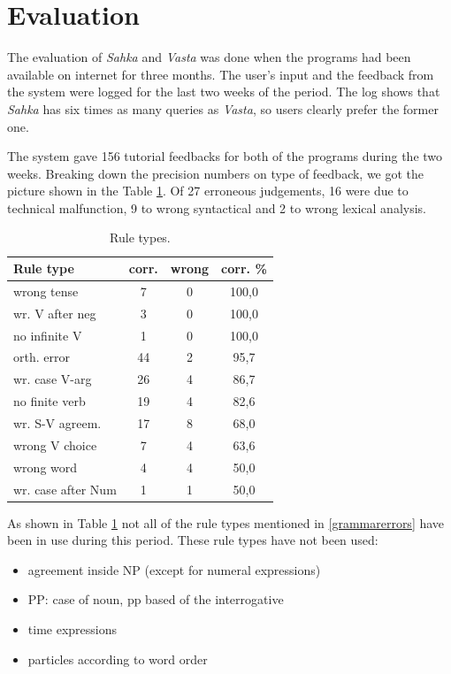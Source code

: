 \documentclass[11pt]{article}
\begin{document}
\section{Evaluation}
The evaluation of \textit{Sahka} and \textit{Vasta} was done when the programs had been available on internet for three months. The user's input and the feedback from the system were logged for the last two weeks of the period. The log shows that \textit{Sahka} has six times as many queries as \textit{Vasta}, so users clearly prefer the former one.


The system gave 156 tutorial feedbacks for both of the programs during the two weeks. Breaking down the precision numbers on type of feedback, we got the picture shown in the Table \ref{ruletypes}. Of 27 erroneous judgements, 16 were due to technical malfunction, 9 to wrong syntactical and 2 to wrong lexical analysis. \\

\begin{table}[htbp]
\begin{tabular}{|l|c|c|c|}
\hline 
\textbf{Rule type}  & \textbf{corr.} & \textbf{wrong}   & \textbf{corr. \% }  \\
\hline 
wrong tense         & 7     & 0     & 100,0     \\ 
wr. V after neg   & 3     & 0     & 100,0     \\ 
no infinite V       & 1     & 0     & 100,0     \\ 
\hline 
orth. error         & 44    & 2     & 95,7      \\
wr. case V-arg  & 26    & 4     & 86,7      \\
no finite verb        & 19    & 4     &  82,6 \\
\hline 
wr. S-V agreem.   & 17    & 8     & 68,0 \\
wrong V choice        & 7     & 4     & 63,6 \\
\hline 
wrong word            & 4     & 4     & 50,0 \\
wr. case after Num  & 1     & 1     & 50,0 \\
\hline
\end{tabular}
\caption{Rule types.}
\label{ruletypes}
\end{table}

As shown in Table \ref{ruletypes} not all of the rule types mentioned in \ref{grammarerrors} have been in use during this period. These rule types have not been used:

\begin{itemize}
\setlength{\itemsep}{-0.7cm}
\item agreement inside NP (except for numeral expressions) \\
\item PP: case of noun, pp based of the interrogative  \\
\item time expressions \\
\item particles according to word order \\
\end{itemize}
\end{document}
